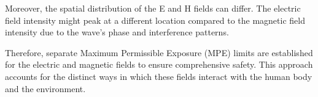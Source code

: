 Moreover, the spatial distribution of the E and H fields can differ. The electric field intensity might peak at a different location compared to the magnetic field intensity due to the wave's phase and interference patterns.

Therefore, separate Maximum Permissible Exposure (MPE) limits are established for the electric and magnetic fields to ensure comprehensive safety. This approach accounts for the distinct ways in which these fields interact with the human body and the environment.

